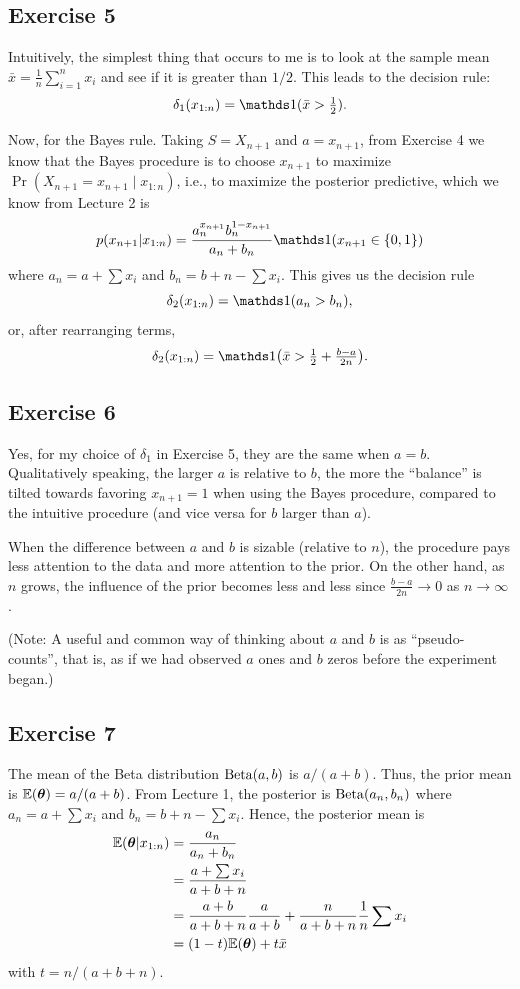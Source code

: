 \documentclass[12pt]{article}
\begin{document}
\subsection*{Exercise 5}

Intuitively, the simplest thing that occurs to me is to look at the sample mean $\bar x =\frac{1}{n}\sum_{i = 1}^n x_i$ and see if it is greater than $1/2$. This leads to the decision rule:
$$\delta_1(x_{1:n}) = \I(\bar x>\tfrac{1}{2}). $$

Now, for the Bayes rule. Taking $S = X_{n+1}$ and $a=x_{n+1}$, from Exercise 4 we know that the Bayes procedure is to choose $x_{n+1}$ to maximize $\Pr(X_{n+1}=x_{n+1} \mid x_{1:n})$, i.e., to maximize the posterior predictive, which we know from Lecture 2 is
$$p(x_{n+1}|x_{1:n}) = \frac{a_n^{x_{n+1}} b_n^{1-x_{n+1}}}{a_n + b_n}\I(x_{n+1}\in\{0,1\})$$
where $a_n = a +\sum x_i$ and $b_n = b + n-\sum x_i$.
This gives us the decision rule
$$\delta_2(x_{1:n}) =\I(a_n>b_n),$$
or, after rearranging terms,
$$\delta_2(x_{1:n}) = \I\big(\bar x>\tfrac{1}{2} +\tfrac{b-a}{2 n}\big). $$


\subsection*{Exercise 6}

Yes, for my choice of $\delta_1$ in Exercise 5, they are the same when $a=b$.  Qualitatively speaking, the larger $a$ is relative to $b$, the more the ``balance'' is tilted towards favoring $x_{n+1}=1$ when using the Bayes procedure, compared to the intuitive procedure (and vice versa for $b$ larger than $a$). 

When the difference between $a$ and $b$ is sizable (relative to $n$), the procedure pays less attention to the data and more attention to the prior.  On the other hand, as $n$ grows, the influence of the prior becomes less and less since $\tfrac{b-a}{2 n} \to 0$ as $n\to \infty$.

(Note: A useful and common way of thinking about $a$ and $b$ is as ``pseudo-counts'', that is, as if we had observed $a$ ones and $b$ zeros before the experiment began.)

\subsection*{Exercise 7}

The mean of the Beta distribution $\operatorname*{Beta}(a,b)$ is $a/(a+b)$. Thus, the prior mean is $\mathbb{E}({\bm\theta}) = a/(a+b)$. From Lecture 1, the posterior is $\operatorname*{Beta}(a_n,b_n)$ where $a_n = a +\sum x_i$ and $b_n = b + n-\sum x_i$. Hence, the posterior mean is 
\begin{align*}
\mathbb{E}({\bm\theta}|x_{1:n}) &= \frac{a_n}{a_n + b_n} \\
& = \frac{a + \sum x_i}{a + b + n} \\
& = \frac{a + b}{a + b + n}\frac{a}{a+b} + \frac{n}{a+b+n}\frac{1}{n}\sum x_i \\
& = (1-t) \mathbb{E}({\bm\theta}) + t \bar x
\end{align*}
with $t = n/(a+b+n)$.
\end{document}
